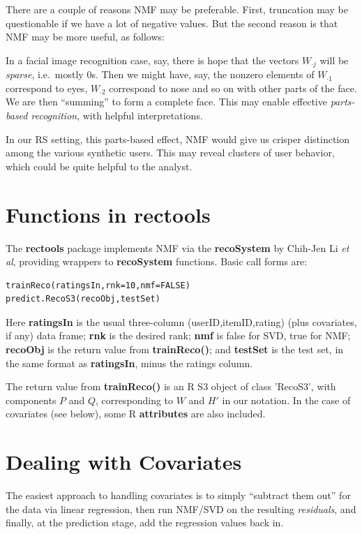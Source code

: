 There are a couple of reasons NMF may be preferable.  First, truncation
may be questionable if we have a lot of negative values.  But the second
reason is that NMF may be more useful, as follows:

In a facial image recognition case, say, there is hope that the vectors
$W_{\cdot j}$ will be {\it sparse}, i.e.\ mostly 0s. Then we might have,
say, the nonzero elements of $W_{\cdot 1}$ correspond to eyes, $W_{\cdot
2}$ correspond to nose and so on with other parts of the face.  We are
then ``summing'' to form a complete face.  This may enable effective
{\it parts-based recognition}, with helpful interpretations.

In our RS setting, this parts-based effect, NMF would give us crisper
distinction among the various synthetic users.  This may reveal clusters
of user behavior, which could be quite helpful to the analyst.

\section{Functions in rectools}

The \textbf{rectools} package implements NMF via the \textbf{recoSystem}
by Chih-Jen Li \textit{et al}, providing wrappers to \textbf{recoSystem}
functions.  Basic call forms are:

\begin{lstlisting}
trainReco(ratingsIn,rnk=10,nmf=FALSE)
predict.RecoS3(recoObj,testSet)
\end{lstlisting}

Here \textbf{ratingsIn} is the usual three-column (userID,itemID,rating)
(plus covariates, if any) data frame; \textbf{rnk} is the desired rank;
\textbf{nmf} is false for SVD, true for NMF; \textbf{recoObj} is the 
return value from \textbf{trainReco()}; and \textbf{testSet} is the test
set, in the same format as \textbf{ratingsIn}, minus the ratings column.

The return value from \textbf{trainReco()} is an R S3 object of class
'RecoS3', with components $P$ and $Q$, corresponding to $W$ and $H'$ in
our notation.  In the case of covariates (see below), some R
\textbf{attributes} are also included.

\section{Dealing with Covariates}

The easiest approach to handling covariates is to simply ``subtract them
out'' for the data via linear regression, then run NMF/SVD on the resulting
\textit{residuals}, and finally, at the prediction stage, add the
regression values back in.

